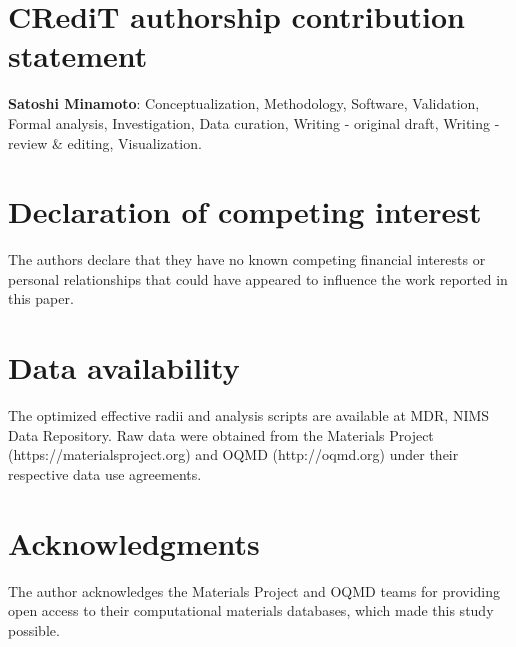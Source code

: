 \documentclass[a4paper,10pt,5p]{elsarticle}
\begin{document}
\section*{CRediT authorship contribution statement}

\textbf{Satoshi Minamoto}: Conceptualization, Methodology, Software, Validation, Formal analysis, Investigation, Data curation, Writing - original draft, Writing - review \& editing, Visualization.


\section*{Declaration of competing interest}

The authors declare that they have no known competing financial interests or personal relationships that could have appeared to influence the work reported in this paper.

\section*{Data availability}

The optimized effective radii and analysis scripts are available at MDR, NIMS Data Repository. Raw data were obtained from the Materials Project (https://materialsproject.org) and OQMD (http://oqmd.org) under their respective data use agreements.


\section*{Acknowledgments}

The author acknowledges the Materials Project and OQMD teams for providing open access to their computational materials databases, which made this study possible. 





\end{document}
